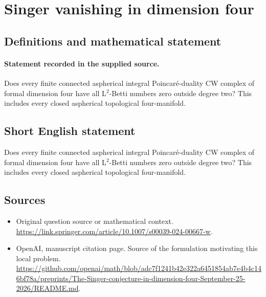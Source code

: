 \documentclass[11pt]{article}
\begin{document}
\section*{Singer vanishing in dimension four}\label{30007508}
\subsection{Definitions and mathematical statement}
\paragraph{Statement recorded in the supplied source.}
Does every finite connected aspherical integral Poincaré-duality CW complex of formal dimension four have all L$^{2}$-Betti numbers zero outside degree two? This includes every closed aspherical topological four-manifold.
\subsection{Short English statement}
Does every finite connected aspherical integral Poincaré-duality CW complex of formal dimension four have all L$^{2}$-Betti numbers zero outside degree two? This includes every closed aspherical topological four-manifold.
\subsection{Sources}
\begin{itemize}
\item[S1] Original question source or mathematical context.
\url{https://link.springer.com/article/10.1007/s00039-024-00667-w}.
\item[S2] OpenAI, manuscript citation page. Source of the formulation motivating this local problem.
\url{https://github.com/openai/math/blob/adc7f1241b42e322a6451854ab7e4b4c146bf78a/preprints/The-Singer-conjecture-in-dimension-four-September-25-2026/README.md}.
\end{itemize}
\end{document}
